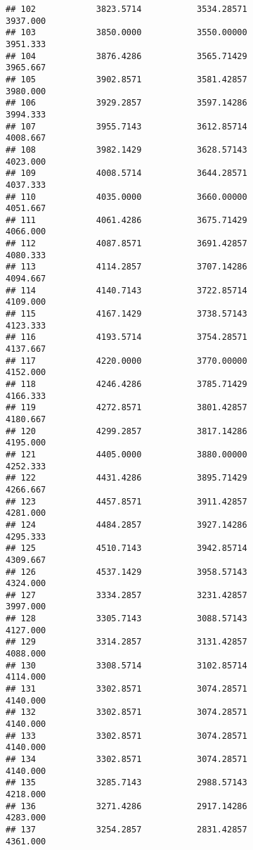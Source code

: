 \documentclass[]{article}
\begin{document}
\begin{verbatim}
## 102            3823.5714           3534.28571                3937.000
## 103            3850.0000           3550.00000                3951.333
## 104            3876.4286           3565.71429                3965.667
## 105            3902.8571           3581.42857                3980.000
## 106            3929.2857           3597.14286                3994.333
## 107            3955.7143           3612.85714                4008.667
## 108            3982.1429           3628.57143                4023.000
## 109            4008.5714           3644.28571                4037.333
## 110            4035.0000           3660.00000                4051.667
## 111            4061.4286           3675.71429                4066.000
## 112            4087.8571           3691.42857                4080.333
## 113            4114.2857           3707.14286                4094.667
## 114            4140.7143           3722.85714                4109.000
## 115            4167.1429           3738.57143                4123.333
## 116            4193.5714           3754.28571                4137.667
## 117            4220.0000           3770.00000                4152.000
## 118            4246.4286           3785.71429                4166.333
## 119            4272.8571           3801.42857                4180.667
## 120            4299.2857           3817.14286                4195.000
## 121            4405.0000           3880.00000                4252.333
## 122            4431.4286           3895.71429                4266.667
## 123            4457.8571           3911.42857                4281.000
## 124            4484.2857           3927.14286                4295.333
## 125            4510.7143           3942.85714                4309.667
## 126            4537.1429           3958.57143                4324.000
## 127            3334.2857           3231.42857                3997.000
## 128            3305.7143           3088.57143                4127.000
## 129            3314.2857           3131.42857                4088.000
## 130            3308.5714           3102.85714                4114.000
## 131            3302.8571           3074.28571                4140.000
## 132            3302.8571           3074.28571                4140.000
## 133            3302.8571           3074.28571                4140.000
## 134            3302.8571           3074.28571                4140.000
## 135            3285.7143           2988.57143                4218.000
## 136            3271.4286           2917.14286                4283.000
## 137            3254.2857           2831.42857                4361.000

\end{verbatim}
\end{document}
